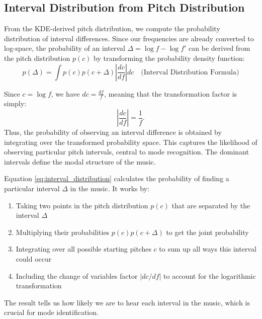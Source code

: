 \documentclass{article}
\begin{document}
\subsection{Interval Distribution from Pitch Distribution}
From the KDE-derived pitch distribution, we compute the probability distribution of interval differences. Since our frequencies are already converted to log-space, the probability of an interval $\Delta = \log f - \log f'$ can be derived from the pitch distribution $p(c)$ by transforming the probability density function:
\begin{equation}\label{eq:interval_distribution}
    p(\Delta) = \int p(c) p(c + \Delta) \left| \frac{d c}{d f} \right| dc \quad \text{(Interval Distribution Formula)}
\end{equation}

Since $c = \log f$, we have $dc = \frac{df}{f}$, meaning that the transformation factor is simply:
\begin{equation}
    \left| \frac{d c}{d f} \right| = \frac{1}{f}.
\end{equation}
Thus, the probability of observing an interval difference is obtained by integrating over the transformed probability space. This captures the likelihood of observing particular pitch intervals, central to mode recognition. The dominant intervals define the modal structure of the music.

Equation \ref{eq:interval_distribution} calculates the probability of finding a particular interval $\Delta$ in the music.
It works by:
\begin{enumerate}
    \item Taking two points in the pitch distribution $p(c)$ that are separated by the interval $\Delta$
    \item Multiplying their probabilities $p(c)p(c+\Delta)$ to get the joint probability
    \item Integrating over all possible starting pitches $c$ to sum up all ways this interval could occur
    \item Including the change of variables factor $|dc/df|$ to account for the logarithmic transformation
\end{enumerate}

The result tells us how likely we are to hear each interval in the music, which is crucial for mode identification.
\end{document}
